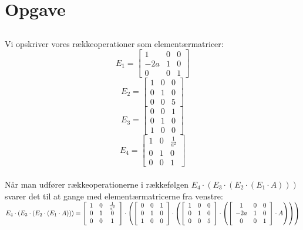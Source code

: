 \documentclass[a4paper,12pt]{article}
\begin{document}
\section[Opgave]{Opgave}
\subsection{}
Vi opskriver vores rækkeoperationer som elementærmatricer:\\
\[
E_1=
\left[\begin{array}{ccc}
    1 & 0 & 0 \\
    -2a & 1 & 0 \\
    0 & 0 & 1
\end{array}\right]
\]
\[
E_2=
\left[\begin{array}{ccc}
    1 & 0 & 0 \\
    0 & 1 & 0 \\
    0 & 0 & 5
\end{array}\right]
\]
\[
E_3=
\left[\begin{array}{ccc}
    0 & 0 & 1 \\
    0 & 1 & 0 \\
    1 & 0 & 0
\end{array}\right]
\]
\[
E_4=
\left[\begin{array}{ccc}
    1 & 0 & \frac{1}{a^2} \\
    0 & 1 & 0 \\
    0 & 0 & 1
\end{array}\right]
\]\\

Når man udfører række­operationerne i rækkefølgen $E_4 \cdot (E_3 \cdot (E_2 \cdot (E_1 \cdot A)))$ svarer det til at gange med elementærmatricerne fra venstre:\\

$
E_4 \cdot (E_3 \cdot (E_2 \cdot (E_1 \cdot A))) 
=
\left[\begin{array}{ccc}
    1 & 0 & \frac{1}{a^2} \\
    0 & 1 & 0 \\
    0 & 0 & 1
\end{array}\right]
\cdot \left( 
\left[\begin{array}{ccc}
    0 & 0 & 1 \\
    0 & 1 & 0 \\
    1 & 0 & 0
\end{array}\right]
\cdot \left( 
\left[\begin{array}{ccc}
    1 & 0 & 0 \\
    0 & 1 & 0 \\
    0 & 0 & 5
\end{array}\right]
\cdot \left( 
\left[\begin{array}{ccc}
    1 & 0 & 0 \\
    -2a & 1 & 0 \\
    0 & 0 & 1
\end{array}\right]
\cdot A\right)\right)\right)
$\\
\end{document}
